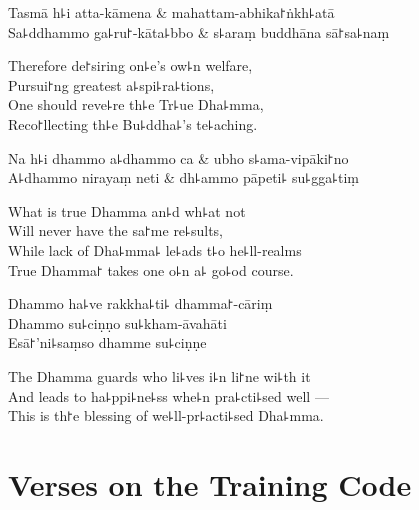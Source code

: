 \begin{twochants}
  Tasmā h꜕i atta-kāmena & mahattam-abhika꜓ṅkh꜕atā \\
  Sa꜕ddhammo ga꜕ru꜓-kāta꜕bbo & s꜕araṃ buddhāna sā꜓sa꜕naṃ \\
\end{twochants}

\begin{english}
  Therefore de꜓siring on꜕e's ow꜕n welfare,\\
  Pursui꜓ng greatest a꜕spi꜕ra꜕tions,\\
  One should reve꜕re th꜕e Tr꜕ue Dha꜕mma,\\
  Reco꜓llecting th꜕e Bu꜕ddha꜕'s te꜕aching.
\end{english}

\begin{twochants}
  Na h꜕i dhammo a꜕dhammo ca & ubho s꜕ama-vipāki꜓no \\
  A꜕dhammo nirayaṃ neti & dh꜕ammo pāpeti꜕ su꜕gga꜕tiṃ \\
\end{twochants}

\begin{english}
  What is true Dhamma an꜕d wh꜕at not\\
  Will never have the sa꜓me re꜕sults,\\
  While lack of Dha꜕mma꜕ le꜕ads t꜕o he꜕ll-realms\\
  True Dhamma꜓ takes one o꜕n a꜕ go꜕od course.
\end{english}

Dhammo ha꜕ve rakkha꜕ti꜕ dhamma꜓-cāriṃ\\
Dhammo su꜕ciṇṇo su꜕kham-āvahāti\\
Esā꜓'ni꜕saṃso dhamme su꜕ciṇṇe

\begin{english}
  The Dhamma guards who li꜕ves i꜕n li꜓ne wi꜕th it\\
  And leads to ha꜕ppi꜕ne꜕ss whe꜕n pra꜕cti꜕sed well ---\\
  This is th꜓e blessing of we꜕ll-pr꜕acti꜕sed Dha꜕mma.
\end{english}

\chapter{Verses on the Training Code}%


\begin{leader}
\end{leader}

